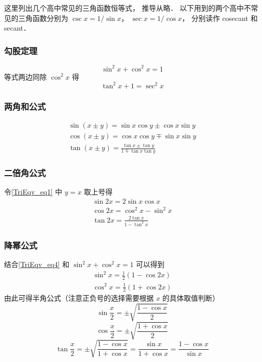 

这里列出几个高中常见的三角函数恒等式， 推导从略． 以下用到的两个高中不常见的三角函数分别为 $\csc x= 1/\sin x$， $\sec x = 1/\cos x$， 分别读作 cosecant 和 secant．

\subsubsection{勾股定理}

\begin{equation}
\sin^2 x + \cos^2 x = 1
\end{equation}
等式两边同除 $\cos^2 x$ 得
\begin{equation}\label{TriEqv_eq13}
\tan^2 x + 1 = \sec^2 x
\end{equation}

\subsubsection{两角和公式}
\begin{gather}\label{TriEqv_eq1}
\sin(x\pm y) = \sin x\cos y \pm \cos x\sin y\\
\label{TriEqv_eq2}
\cos(x\pm y) = \cos x\cos y \mp \sin x\sin y\\
\tan(x\pm y) = \frac{\tan x \pm \tan y}{1 \mp \tan x \tan y}
\end{gather}

\subsubsection{二倍角公式}

令\autoref{TriEqv_eq1} 中 $y=x$ 取上号得
\begin{gather}
\sin 2x = 2\sin x\cos x\\
\label{TriEqv_eq4}
\cos 2x = \cos^2 x - \sin^2 x\\
\tan 2x = \frac{2\tan x}{1 - \tan^2 x}
\end{gather}

\subsubsection{降幂公式}

结合\autoref{TriEqv_eq4} 和 $\sin^2 x + \cos^2 x = 1$ 可以得到
\begin{gather}
\sin^2 x = \frac12 (1- \cos 2x) \label{TriEqv_eq5} \\
\cos^2 x = \frac12 (1+\cos 2x) \label{TriEqv_eq6}
\end{gather}
由此可得半角公式（注意正负号的选择需要根据 $x$ 的具体取值判断）
\begin{equation}
\sin\frac{ x}{2} = \pm\sqrt{\frac{1-\cos x}{2}}
\end{equation}
\begin{equation}
\cos\frac{ x}{2}= \pm\sqrt{\frac{1+\cos x}{2}}
\end{equation}
\begin{equation}
\tan\frac{ x}{2} = \pm\sqrt{\frac{1-\cos x}{1+\cos x}} = \frac{\sin x}{1+\cos x} = \frac{1-\cos x}{\sin x}
\end{equation}

